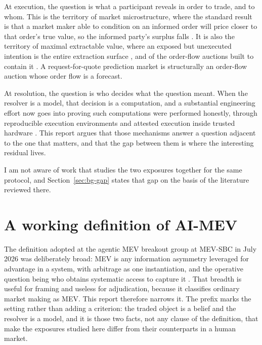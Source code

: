 At execution, the question is what a participant reveals in order to trade, and to whom.
This is the territory of market microstructure, where the standard result is that a market
maker able to condition on an informed order will price closer to that order's true value,
so the informed party's surplus falls \cite{glosten1985bidask,kyle1985continuous}. It is
also the territory of maximal extractable value, where an exposed but unexecuted intention
is the entire extraction surface \cite{daian2019flashboys,ethereummev}, and of the order-flow
auctions built to contain it \cite{passeratpalmbach2025dphints}. A request-for-quote
prediction market is structurally an order-flow auction whose order flow is a forecast.

At resolution, the question is who decides what the question meant. When the resolver is a
model, that decision is a computation, and a substantial engineering effort now goes into
proving such computations were performed honestly, through reproducible execution
environments and attested execution inside trusted hardware
\cite{gensyn2026receipts,truebit2026orchestration}. This report argues that those mechanisms
answer a question adjacent to the one that matters, and that the gap between them is where
the interesting residual lives.

I am not aware of work that studies the two exposures together for the same protocol, and
Section~\ref{sec:bg-gap} states that gap on the basis of the literature reviewed there.

\section{A working definition of AI-MEV}
\label{sec:definition}

The definition adopted at the agentic MEV breakout group at MEV-SBC in July 2026 was
deliberately broad: MEV is any information asymmetry leveraged for advantage in a system,
with arbitrage as one instantiation, and the operative question being who obtains systematic
access to capture it \cite{mevsbc2026breakout}. That breadth is useful for framing and
useless for adjudication, because it classifies ordinary market making as MEV. This report
therefore narrows it. The prefix marks the setting rather than adding a criterion: the
traded object is a belief and the resolver is a model, and it is those two facts, not any
clause of the definition, that make the exposures studied here differ from their
counterparts in a human market.

